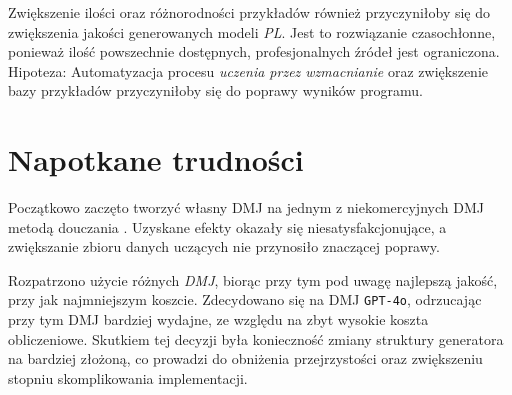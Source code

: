 Zwiększenie ilości oraz różnorodności przykładów również przyczyniłoby się do zwiększenia jakości generowanych modeli \textit{PL}. Jest to rozwiązanie czasochłonne, ponieważ ilość powszechnie dostępnych, profesjonalnych źródeł jest ograniczona.
Hipoteza: Automatyzacja procesu \textit{uczenia przez wzmacnianie} oraz zwiększenie bazy przykładów przyczyniłoby się do poprawy wyników programu.

\section{Napotkane trudności}

Początkowo zaczęto tworzyć własny DMJ na jednym z niekomercyjnych DMJ metodą douczania . Uzyskane efekty okazały się niesatysfakcjonujące, a zwiększanie zbioru danych uczących nie przynosiło znaczącej poprawy.


Rozpatrzono użycie różnych \textit{DMJ}, biorąc przy tym pod uwagę najlepszą jakość, przy jak najmniejszym koszcie. %
Zdecydowano się na DMJ \texttt{GPT-4o}, odrzucając przy tym DMJ bardziej wydajne, %
ze względu na zbyt wysokie koszta obliczeniowe. Skutkiem tej decyzji była konieczność zmiany struktury generatora na bardziej złożoną, co prowadzi do obniżenia przejrzystości oraz zwiększeniu stopniu skomplikowania implementacji.